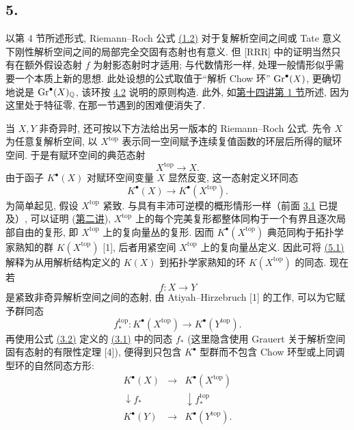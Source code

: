 \subsection*{5.}
以第 4 节所述形式, Riemann--Roch 公式 \hyperlink{sga6.e00.eq.1-2}{(1.2)} 对于复解析空间之间或 Tate 意义下刚性解析空间之间的局部完全交固有态射也有意义. 但 [RRR] 中的证明当然只有在额外假设态射 $f$ 为射影态射时才适用; 与代数情形一样, 处理一般情形似乎需要一个本质上新的思想. 此处设想的公式取值于“解析 Chow 环” $\operatorname{Gr}^\bullet(X)$, 更确切地说是 $\operatorname{Gr}^\bullet(X)_{\mathbb Q}$, 该环按 \hyperlink{sga6.e00.sec.4.2}{4.2} 说明的原则构造. 此外, 如\hyperlink{sga6.e14.sec.1}{第十四讲第 1 节}所述, 因为这里处于特征零, 在那一节遇到的困难便消失了.

当 $X,Y$ 非奇异时, 还可按以下方法给出另一版本的 Riemann--Roch 公式. 先令 $X$ 为任意复解析空间, 以 $X^{\mathrm{top}}$ 表示同一空间赋予连续复值函数的环层后所得的赋环空间. 于是有赋环空间的典范态射
\[
X^{\mathrm{top}}\longrightarrow X.
\]
由于函子 $K^\bullet(X)$ 对赋环空间变量 $X$ 显然反变, 这一态射定义环同态
\begin{equation}\tag{5.1}
K^\bullet(X)\longrightarrow K^\bullet(X^{\mathrm{top}}).
\end{equation}
为简单起见, 假设 $X^{\mathrm{top}}$ 紧致. 与具有丰沛可逆模的概形情形一样（前面 \hyperlink{sga6.e00.sec.3.1}{3.1} 已提及）, 可以证明 (\hyperlink{sga6.e02.expose}{第二讲}), $X^{\mathrm{top}}$ 上的每个完美复形都整体同构于一个有界且逐次局部自由的复形, 即 $X^{\mathrm{top}}$ 上的复向量丛的复形. 因而 $K^\bullet(X^{\mathrm{top}})$ 典范同构于拓扑学家熟知的群 $K(X^{\mathrm{top}})$ [1], 后者用紧空间 $X^{\mathrm{top}}$ 上的复向量丛定义. 因此可将 \hyperlink{sga6.e00.eq.5-1}{(5.1)} 解释为从用解析结构定义的 $K(X)$ 到拓扑学家熟知的环 $K(X^{\mathrm{top}})$ 的同态. 现在若
\[
f:X\longrightarrow Y
\]
是紧致非奇异解析空间之间的态射, 由 Atiyah--Hirzebruch [1] 的工作, 可以为它赋予群同态
\begin{equation}\tag{5.2}
f^{\mathrm{top}}_*:K^\bullet(X^{\mathrm{top}})\longrightarrow K^\bullet(Y^{\mathrm{top}}).
\end{equation}
再使用公式 \hyperlink{sga6.e00.eq.3-2}{(3.2)} 定义的 \hyperlink{sga6.e00.eq.3-1}{(3.1)} 中的同态 $f_*$ (这里隐含使用 Grauert 关于解析空间固有态射的有限性定理 [4]), 便得到只包含 $K^\bullet$ 型群而不包含 Chow 环型或上同调型环的自然同态方形:
\begin{equation}\tag{5.3}
\begin{array}{ccc}
K^\bullet(X) & \longrightarrow & K^\bullet(X^{\mathrm{top}}) \\
\downarrow f_* && \downarrow f^{\mathrm{top}}_* \\
K^\bullet(Y) & \longrightarrow & K^\bullet(Y^{\mathrm{top}}).
\end{array}
\end{equation}

